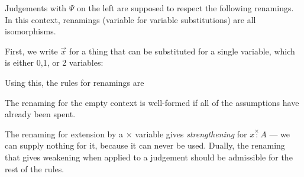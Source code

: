 \documentclass{amsart}
\let\types\vdash %
\def\p{^+} %
\def\m{^-}
\let\mypm\pm
\def\pm{^\mypm}
\newcommand\uns{\times}
\def\pcol{\overset{\scriptscriptstyle +}{:}}
\def\mcol{\overset{\scriptscriptstyle -}{:}}
\def\pmcol{\overset{\scriptscriptstyle \pm}{:}}
\def\uncol{\overset{\scriptscriptstyle \times}{:}}
\newcommand\vcol[1]{\overset{\scriptscriptstyle #1}{:}}
\newcommand\combine{\sqcup}
\newcommand\triv{\_}
\begin{document}
Judgements with $\Psi$ on the left are supposed to respect the following
renamings.  In this context, renamings (variable for variable
substitutions) are all isomorphisms.

First, we write $\vec{x}$ for a thing that can be substituted for a
single variable, which is either 0,1, or 2 variables:
Using this, the rules for renamings are


The renaming for the empty context is well-formed if all of the
assumptions have already been spent.

The renaming for extension by a $\uns$ variable gives
\emph{strengthening} for $x \uncol A$ --- we can supply nothing for it,
because it can never be used.  Dually, the renaming that gives weakening
when applied to a judgement should be admissible for the rest of the
rules.
\end{document}
